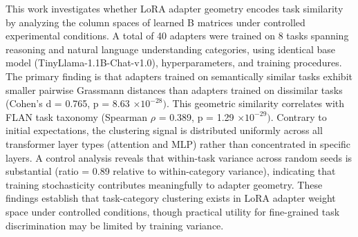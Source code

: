 
This work investigates whether LoRA adapter geometry encodes task similarity by analyzing the column spaces of learned B matrices under controlled experimental conditions. A total of 40 adapters were trained on 8 tasks spanning reasoning and natural language understanding categories, using identical base model (TinyLlama-1.1B-Chat-v1.0), hyperparameters, and training procedures. The primary finding is that adapters trained on semantically similar tasks exhibit smaller pairwise Grassmann distances than adapters trained on dissimilar tasks (Cohen's d = 0.765, p = 8.63 $\times 10^{-28})$. This geometric similarity correlates with FLAN task taxonomy (Spearman $\rho$ = 0.389, p = 1.29 $\times 10^{-29})$. Contrary to initial expectations, the clustering signal is distributed uniformly across all transformer layer types (attention and MLP) rather than concentrated in specific layers. A control analysis reveals that within-task variance across random seeds is substantial (ratio = 0.89 relative to within-category variance), indicating that training stochasticity contributes meaningfully to adapter geometry. These findings establish that task-category clustering exists in LoRA adapter weight space under controlled conditions, though practical utility for fine-grained task discrimination may be limited by training variance.
